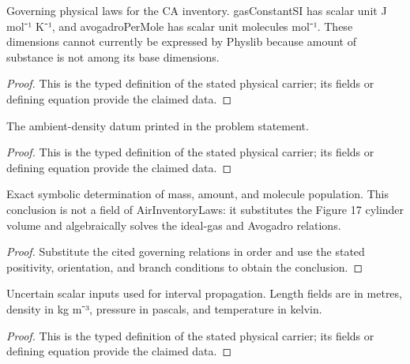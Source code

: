 \begin{definition}
  \label{def:physics:IPhO_2026_4_A_1:aux020}
  Governing physical laws for the CA inventory. gasConstantSI has scalar unit J mol⁻¹ K⁻¹, and avogadroPerMole has scalar unit molecules mol⁻¹. These dimensions cannot currently be expressed by Physlib because amount of substance is not among its base dimensions.
\end{definition}
\begin{proof}
  This is the typed definition of the stated physical carrier; its fields or defining equation provide the claimed data.
\end{proof}

\begin{definition}
  \label{def:physics:IPhO_2026_4_A_1:aux021}
  The ambient-density datum printed in the problem statement.
\end{definition}
\begin{proof}
  This is the typed definition of the stated physical carrier; its fields or defining equation provide the claimed data.
\end{proof}

\begin{lemma}
  \label{lem:physics:IPhO_2026_4_A_1:aux022}
  Exact symbolic determination of mass, amount, and molecule population. This conclusion is not a field of AirInventoryLaws: it substitutes the Figure 17 cylinder volume and algebraically solves the ideal-gas and Avogadro relations.
\end{lemma}
\begin{proof}
  Substitute the cited governing relations in order and use the stated positivity, orientation, and branch conditions to obtain the conclusion.
\end{proof}

\begin{definition}
  \label{def:physics:IPhO_2026_4_A_1:aux023}
  Uncertain scalar inputs used for interval propagation. Length fields are in metres, density in kg m⁻³, pressure in pascals, and temperature in kelvin.
\end{definition}
\begin{proof}
  This is the typed definition of the stated physical carrier; its fields or defining equation provide the claimed data.
\end{proof}

